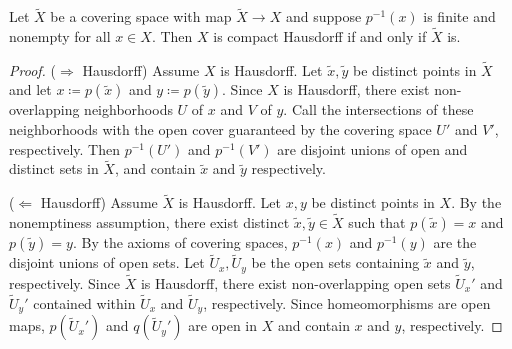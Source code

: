 \documentclass[a5paper]{article}
\newcommand{\wt}{\widetilde}
\begin{document}
\begin{proposition*}
	Let $\wt{X}$ be a covering space with map $\wt{X}\to X$ and suppose
  $p^{-1}(x)$ is finite and nonempty for all $x\in X$. Then $X$ is compact
  Hausdorff if and only if $\wt{X}$ is.
\end{proposition*}
\begin{proof}
	($\Rightarrow$ Hausdorff) Assume $X$ is Hausdorff. Let $\wt{x},\wt{y}$ be
  distinct points in $\wt{X}$ and let $x\coloneqq p(\wt{x})$
  and $y\coloneqq p(\wt{y})$. Since $X$ is Hausdorff, there exist non-overlapping
  neighborhoods $U$ of $x$ and $V$ of $y$. Call the intersections of these
  neighborhoods with the open cover guaranteed by the covering space $U'$ and
  $V'$, respectively. Then $p^{-1}(U')$ and $p^{-1}(V')$ are disjoint unions of
  open and distinct sets in $\wt{X}$, and contain $\wt{x}$ and $\wt{y}$
  respectively.

	($\Leftarrow$ Hausdorff) Assume $\wt{X}$ is Hausdorff. Let $x,y$ be
  distinct points in $X$. By the nonemptiness assumption, there exist
  distinct $\wt{x},\wt{y}\in\wt{X}$ such that $p(\wt{x})=x$ and $p(\wt{y})=y$.
  By the axioms of covering spaces, $p^{-1}(x)$ and $p^{-1}(y)$ are the disjoint
  unions of open sets. Let $\wt{U}_x,\wt{U}_y$ be the open sets containing
  $\wt{x}$ and $\wt{y}$, respectively. Since $\wt{X}$ is Hausdorff, there exist
  non-overlapping open sets $\wt{U}_x'$ and $\wt{U}_y'$ contained within
  $\wt{U}_x$ and $\wt{U}_y$, respectively. Since homeomorphisms are open maps,
  $p(\wt{U}_x')$ and $q(\wt{U}_y')$ are open in $X$ and contain $x$ and $y$,
  respectively. 
\end{proof}
\end{document}
